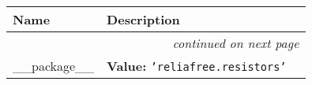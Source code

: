     \vspace{-1cm}
\hspace{\varindent}\begin{longtable}{|p{\varnamewidth}|p{\vardescrwidth}|l}
\cline{1-2}
\cline{1-2} \centering \textbf{Name} & \centering \textbf{Description}& \\
\cline{1-2}
\endhead\cline{1-2}\multicolumn{3}{r}{\small\textit{continued on next page}}\\\endfoot\cline{1-2}
\endlastfoot\raggedright \_\-\_\-p\-a\-c\-k\-a\-g\-e\-\_\-\_\- & \raggedright \textbf{Value:} 
{\tt \texttt{'}\texttt{reliafree.resistors}\texttt{'}}&\\
\cline{1-2}
\end{longtable}

